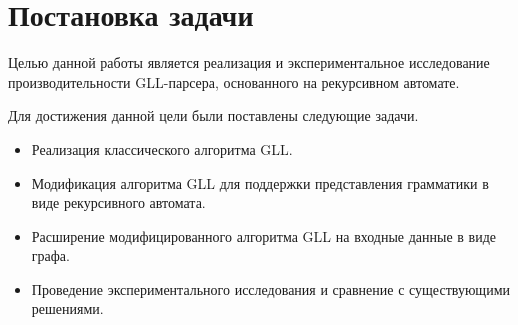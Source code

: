 \section{Постановка задачи}\label{ps}
Целью данной работы является реализация и экспериментальное исследование производительности GLL-парсера, основанного на рекурсивном автомате.

Для достижения данной цели были поставлены следующие задачи.

\begin{itemize}
    \item Реализация классического алгоритма GLL.
    \item Модификация алгоритма GLL для поддержки представления грамматики в виде рекурсивного автомата.
    \item Расширение модифицированного алгоритма GLL на входные данные в виде графа.
    \item Проведение экспериментального исследования и сравнение с существующими решениями.
\end{itemize}